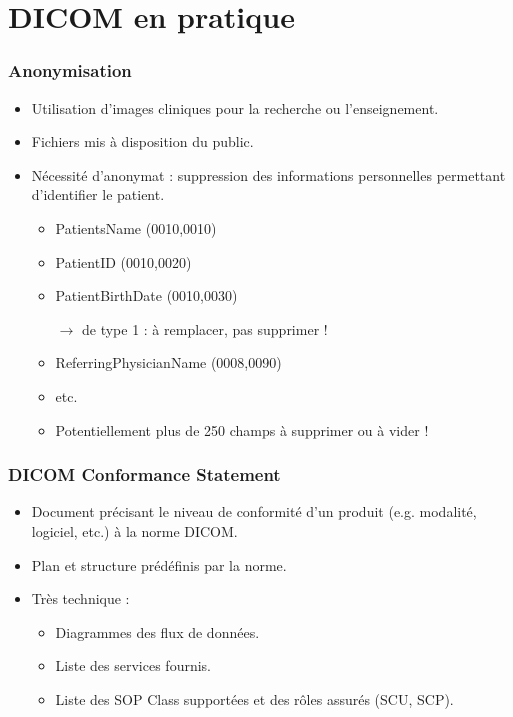 \section{DICOM en pratique}

\frame
{
	\frametitle{Anonymisation}
	\begin{itemize}
		\item Utilisation d'images cliniques pour la recherche ou l'enseignement.
		\item Fichiers mis \`a disposition du public.
		\item N\'ecessit\'e d'anonymat : suppression des informations personnelles permettant d'identifier le patient.
		\begin{itemize}
			\item PatientsName (0010,0010)
			\item PatientID (0010,0020)
			\item PatientBirthDate (0010,0030)
			
			$\rightarrow$ de type 1 : \`a remplacer, pas supprimer !
			\item ReferringPhysicianName (0008,0090)
			\item etc.
			\item Potentiellement plus de 250 champs \`a supprimer ou \`a vider !
		\end{itemize}
	\end{itemize}
}

\frame
{
	\frametitle{DICOM Conformance Statement}
	\begin{itemize}
		\item Document pr\'ecisant le niveau de conformit\'e d'un produit (e.g. modalit\'e, logiciel, etc.) \`a la norme DICOM.
		\item Plan et structure pr\'ed\'efinis par la norme.
		\item Tr\`es technique :
		\begin{itemize}
			\item Diagrammes des flux de donn\'ees.
			\item Liste des services fournis.
			\item Liste des SOP Class support\'ees et des r\^oles assur\'es (SCU, SCP).
		\end{itemize}
	\end{itemize}
}

